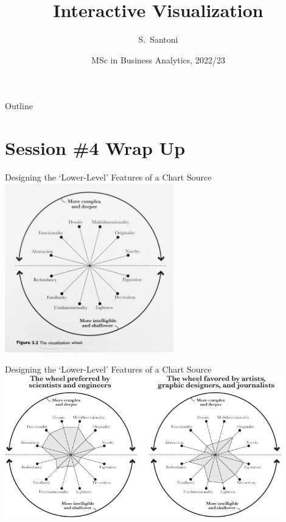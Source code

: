 \documentclass[notes, aspectratio=1610]{beamer}
\title{Interactive Visualization}
\author{S.~Santoni\inst{1}\inst{2}}
\institute{
	\inst{1}%
	Bayes Business School
	\and
	\inst{2}%
	Soundcloud
	}
\date{MSc in Business Analytics, 2022/23}
\begin{document}
\begin{frame}
	\titlepage
\end{frame}

\begin{frame}{Outline}
	\tableofcontents
\end{frame}

\section{Session \#4 Wrap Up}

\begin{frame}{Designing the `Lower-Level' Features of a Chart}
	{Source \cite[][page 61]{cairo2012}}
	\centering 
	\includegraphics[width=0.55\textwidth]{images/viz_wheel.jpeg}
\end{frame}

\begin{frame}{Designing the `Lower-Level' Features of a Chart}
	{Source \cite[][page 63]{cairo2012}}
	\centering 
	\includegraphics[width=0.9\textwidth]{images/viz_whell_comparison.jpeg}
\end{frame}
\end{document}

